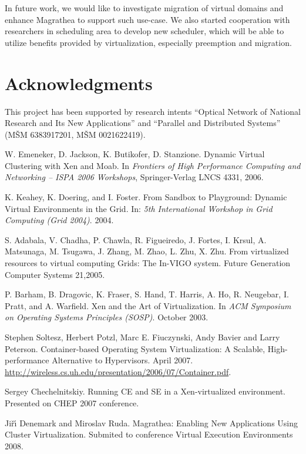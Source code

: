 \documentclass[a4paper]{article}
\begin{document}
In future work, we would like to investigate migration of virtual domains and
enhance Magrathea to support such use-case. We also started cooperation with
researchers in scheduling area to develop new scheduler, which will be able to
utilize benefits provided by virtualization, especially preemption and
migration.

\section*{Acknowledgments}

This project has been supported by research intents ``Optical Network of
National Research and Its New Applications'' and ``Parallel and Distributed
Systems'' (M\v{S}M 6383917201, M\v{S}M 0021622419).

\begin{thebibliography}{99}
W. Emeneker, D. Jackson, K. Butikofer, D. Stanzione.
Dynamic Virtual Clustering with Xen and Moab.
In {\em Frontiers of High Performance Computing and Networking -- ISPA 2006
Workshops}, Springer-Verlag LNCS 4331, 2006.

K. Keahey, K. Doering, and I. Foster. From Sandbox to Playground: Dynamic
Virtual
Environments in the Grid. In: {\em 5th International Workshop in Grid Computing
(Grid 2004)}. 2004.

S. Adabala, V. Chadha, P. Chawla, R. Figueiredo, J. Fortes, I. Krsul,
A. Matsunaga, M. Tsugawa, J. Zhang, M. Zhao, L. Zhu, X. Zhu.
From virtualized resources to virtual computing Grids: The In-VIGO system. Future Generation
Computer Systems 21,2005.

P. Barham, B. Dragovic, K. Fraser, S.
Hand, T. Harris, A. Ho, R. Neugebar, I. Pratt, and A.
Warfield. Xen and the Art of Virtualization. In {\em ACM
Symposium on Operating Systems Principles (SOSP)}. October 2003.

Stephen Soltesz, Herbert Potzl, Marc E. Fiuczynski, Andy Bavier and Larry Peterson. Container-based
Operating System Virtualization: A Scalable, High-performance Alternative to Hypervisors. April 2007.
\url{http://wireless.cs.uh.edu/presentation/2006/07/Container.pdf}.

 Sergey Chechelnitskiy. Running CE and SE in a Xen-virtualized environment. Presented on
CHEP 2007 conference.

 Ji\v{r}\'\i{} Denemark and Miroslav Ruda. Magrathea: Enabling New Applications Using Cluster
Virtualization. Submited to conference Virtual Execution Environments 2008.


\end{thebibliography}
\end{document}

